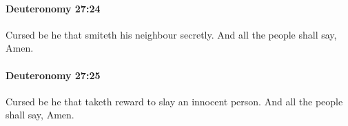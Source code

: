 		\paragraph{Deuteronomy 27:24} %
			\label{DEUTERONOMY-27-24}

			Cursed be he that smiteth his neighbour secretly. And all the people shall say, Amen.


		\paragraph{Deuteronomy 27:25} %
			\label{DEUTERONOMY-27-25}

			Cursed be he that taketh reward to slay an innocent person. And all the people shall say, Amen.


